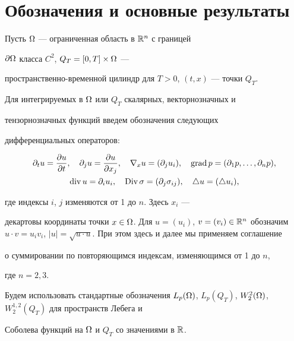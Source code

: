 \section{Обозначения и основные результаты}





Пусть $\Omega$ --- ограниченная область в $\Bbb R^n$ с границей


$\partial\Omega$ класса $C^2$, $Q_T=[0,T]\times\Omega$ ---


пространственно-временной цилиндр для $T>0$, $(t,x)$ --- точки $Q_T$.





Для интегрируемых в $\Omega$ или $Q_T$ скалярных, векторнозначных и


тензорнозначных функций введем обозначения следующих


дифференциальных операторов:


\begin{gather*}


\partial_t u=\fr u t,\quad \partial_j u=\fr u {x_j},\quad \nabla_x u


=(\partial_j u_i),\quad \grad p=(\partial_1 p,


\dotsc,\partial_n p), \\


%


\dv u=\partial_i u_i,\quad \Div \sigma=(\partial_j


\sigma_{ij}),\quad \triangle u=(\triangle u_i),


\end{gather*}


где индексы $i$, $j$ изменяются от 1 до $n$. Здесь $x_i$ ---


декартовы координаты точки $x\in\Om$. Для $u=(u_i)$, $v=


(v_i)\in\R^n$ обозначим $u\cdot v=u_iv_i$, $|u|


=\sqrt{u\cdot u}$. При этом здесь и далее мы применяем соглашение


о суммировании по повторяющимся индексам, изменяющимся от 1 до $n$,


где $n=2,3$.





Будем использовать стандартные обозначения $L_p(\Om)$, $L_p


(Q_T)$, $W_2^2(\Om)$, $W_2^{1,2}(Q_T)$ для пространств Лебега и


Соболева функций на $\Omega$ и $Q_T$ со значениями в $\Bbb R$.



